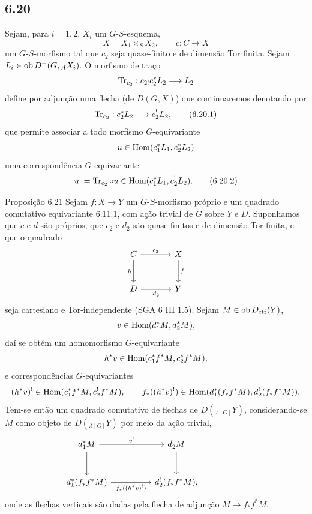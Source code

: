 \subsection*{6.20}
Sejam, para $i=1,2$, $X_i$ um $G$-$S$-esquema,
\[
X=X_1\times_SX_2,\qquad c:C\to X
\]
um $G$-$S$-morfismo tal que $c_2$ seja quase-finito e de dimensão Tor finita. Sejam $L_i\in\operatorname{ob} D^+(G,{}_AX_i)$. O morfismo de traço
\[
\operatorname{Tr}_{c_2}:c_{2!}c_2^*L_2\longrightarrow L_2
\]
define por adjunção uma flecha (de $D(G,X)$) que continuaremos denotando por
\begin{equation}
\operatorname{Tr}_{c_2}:c_2^*L_2\longrightarrow c_2^!L_2,
\tag{6.20.1}
\end{equation}
que permite associar a todo morfismo $G$-equivariante
\[
u\in\operatorname{Hom}(c_1^*L_1,c_2^*L_2)
\]
uma correspondência $G$-equivariante
\begin{equation}
u^! = \operatorname{Tr}_{c_2}\circ u\in\operatorname{Hom}(c_1^*L_1,c_2^!L_2).
\tag{6.20.2}
\end{equation}

\begin{statement}{Proposição 6.21}
Sejam $f:X\to Y$ um $G$-$S$-morfismo próprio e um quadrado comutativo equivariante 6.11.1, com ação trivial de $G$ sobre $Y$ e $D$. Suponhamos que $c$ e $d$ são próprios, que $c_2$ e $d_2$ são quase-finitos e de dimensão Tor finita, e que o quadrado
\[
\begin{tikzcd}[column sep=large,row sep=large]
C \arrow[r,"c_2"] \arrow[d,"h"'] & X \arrow[d,"f"]\\
D \arrow[r,"d_2"'] & Y
\end{tikzcd}
\]
seja cartesiano e Tor-independente (SGA 6 III 1.5). Sejam $M\in\operatorname{ob} D_{\mathrm{ctf}}(Y)$,
\[
v\in\operatorname{Hom}(d_1^*M,d_2^*M),
\]
daí se obtém um homomorfismo $G$-equivariante
\[
h^*v\in\operatorname{Hom}(c_1^*f^*M,c_2^*f^*M),
\]
e correspondências $G$-equivariantes
\[
(h^*v)^!\in\operatorname{Hom}(c_1^*f^*M,c_2^!f^*M),
\qquad
f_*((h^*v)^!)\in\operatorname{Hom}(d_1^*(f_*f^*M),d_2^!(f_*f^*M)).
\]
Tem-se então um quadrado comutativo de flechas de $D({}_{\Lambda[G]}Y)$, considerando-se $M$ como objeto de $D({}_{\Lambda[G]}Y)$ por meio da ação trivial,
\[
\begin{tikzcd}[column sep=huge,row sep=large]
d_1^*M \arrow[r,"v^!"] \arrow[d] & d_2^!M \arrow[d] & {}\\
d_1^*(f_*f^*M) \arrow[r,"f_*((h^*v)^!)"'] & d_2^!(f_*f^*M),
\end{tikzcd}
\]
onde as flechas verticais são dadas pela flecha de adjunção $M\to f_*f^*M$.
\end{statement}

